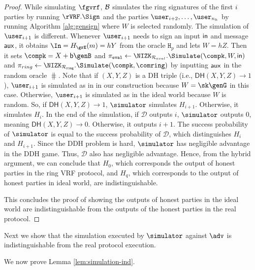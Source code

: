 \begin{proof}
	
	While simulating $ \fgvrf $, $\mathcal{B} $ simulates the ring signatures of the first $ i $ parties by running $ \rVRF.\Sign $ and the parties $ \user_{i+2}, \ldots, \user_{n_h} $ by running Algorithm \ref{alg:gensign} where $ W $ is selected randomly. The simulation of $ \user_{i + 1} $ is different.  Whenever $ \user_{i+1} $ needs to sign an input $ \mathsf{in}$ and message $ \mathsf{aux} $, it obtains $ \In = \hashG(m) = hY $ from the oracle $ \mathtt{H}_p $ and lets $ W = hZ $. Then it sets $ \compk = X + \openpk\genB $ and  $ \pieval \leftarrow \NIZK_{\rcom}. \Simulate(\compk,W,\msg) $ and  $ \pi_{ring} \leftarrow \NIZK_{\rsnark}. \Simulate(\compk, \comring) $ by inputting $ \mathsf{aux} $ in the random oracle $ \hash $.  Note that if $ (X,Y,Z)$ is a DH triple (i.e., $  \mathsf{DH}(X,Y,Z) \rightarrow 1 $), $ \user_{i+1} $ is simulated as in in our construction because $ W = \sk \genG$ in this case. Otherwise, $ \user_{i+1} $ is simulated as in the ideal world because $ W $ is random. So, if $  \mathsf{DH}(X,Y,Z)  \rightarrow 1$, $\simulator $ simulates $ H_{i+1} $. Otherwise, it simulates $ H_{i} $. In the end of the simulation, if $ \mathcal{D} $ outputs $ i $, $\simulator $ outputs $ 0 $, meaning $  \mathsf{DH}(X,Y,Z) \rightarrow 0$. Otherwise, it outputs $ i + 1 $. The success probability of $\simulator $ is equal to the success probability of $\mathcal{D} $, which distinguishes $ H_i $ and $ H_{i +1} $. Since the DDH problem is hard, $\simulator $ has negligible advantage in the DDH game. Thus, $ \mathcal{D} $ also has negligible advantage. Hence, from the hybrid argument, we can conclude that $ H_0    $, which corresponds the output of honest parties in  the ring VRF protocol, and $ H_q  $, which corresponds to  the output of honest parties in ideal world, are indistinguishable.
	
	This concludes the proof of showing the outputs of honest parties in the ideal world are indistinguishable from the outputs of the honest parties in the real protocol.
\end{proof}	

Next we show that the simulation executed by $ \simulator $ against $ \adv $ is indistinguishable from the real protocol execution.

We now prove Lemma \ref{lem:simulation-ind}.


